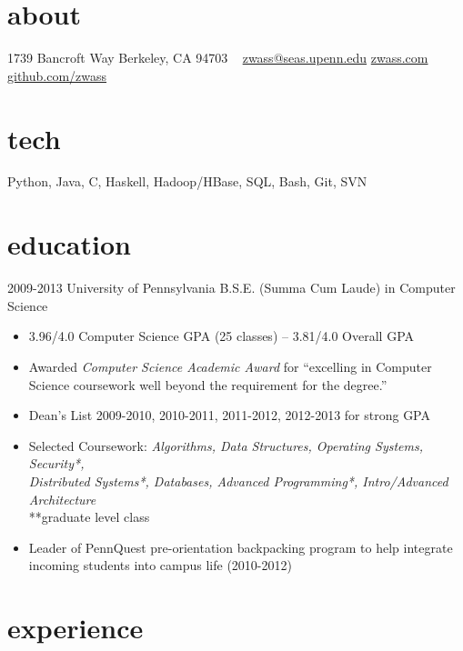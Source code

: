 \documentclass[]{wasserman-cv}
\begin{document}


\begin{aside}
  \section{about}
  1739 Bancroft Way
  Berkeley, CA 94703
  ~
  \href{mailto:zwass@seas.upenn.edu}{zwass@seas.upenn.edu}
  \href{http://zwass.com}{zwass.com}
  \href{http://github.com/zwass}{github.com/zwass}
  \section{tech}
  Python, Java,
  C, Haskell,
  Hadoop/HBase,
  SQL, Bash, Git, SVN
\end{aside}

\vspace{\parskip}
\section{education}

\begin{entrylist}
  \entry
    {2009-2013}
    {University of Pennsylvania}
    {B.S.E. (Summa Cum Laude) in Computer Science}
    {\begin{itemize}
      \item 3.96/4.0 Computer Science GPA (25 classes) – 3.81/4.0 Overall GPA
      \item Awarded \emph{Computer Science Academic Award} for ``excelling in Computer Science coursework well beyond the requirement for the degree.''
      \item Dean’s List 2009-2010, 2010-2011, 2011-2012, 2012-2013 for strong GPA
      \item Selected Coursework: \emph{Algorithms, Data Structures, Operating Systems, Security*,\\
          Distributed Systems*, Databases, Advanced
          Programming*, Intro/Advanced Architecture}\\
        **graduate level class
      \item Leader of PennQuest pre-orientation backpacking program to
        help integrate incoming students into campus life (2010-2012)
    \end{itemize}
    }
\end{entrylist}

\section{experience}
\end{document}
